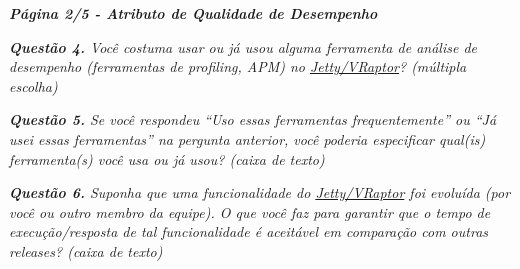 \begin{framed}
	\noindent \textit{\textbf{Página 2/5 - Atributo de Qualidade de Desempenho}}
	\par
	\noindent \textit{\textbf{Questão 4.} Você costuma usar ou já usou alguma ferramenta de análise de desempenho (ferramentas de profiling, APM) no \underline{Jetty/VRaptor}? (múltipla escolha)}
	\par
	\noindent \textit{\textbf{Questão 5.} Se você respondeu ``Uso essas ferramentas frequentemente'' ou ``Já usei essas ferramentas'' na pergunta anterior, você poderia especificar qual(is) ferramenta(s) você usa ou já usou? (caixa de texto)}
	\par
	\noindent \textit{\textbf{Questão 6.} Suponha que uma funcionalidade do \underline{Jetty/VRaptor} foi evoluída (por você ou outro membro da equipe). O que você faz para garantir que o tempo de execução/resposta de tal funcionalidade é aceitável em comparação com outras releases? (caixa de texto)}
\end{framed}

